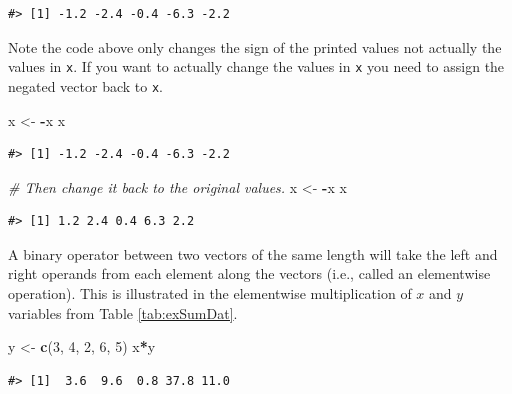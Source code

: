 \documentclass[
  11pt,
]{krantz}
\newenvironment{Shaded}{\begin{snugshade}}{\end{snugshade}}
\newcommand{\CommentTok}[1]{\textcolor[rgb]{0.56,0.35,0.01}{\textit{#1}}}
\newcommand{\DecValTok}[1]{\textcolor[rgb]{0.00,0.00,0.81}{#1}}
\newcommand{\KeywordTok}[1]{\textcolor[rgb]{0.13,0.29,0.53}{\textbf{#1}}}
\newcommand{\NormalTok}[1]{#1}
\newcommand{\OperatorTok}[1]{\textcolor[rgb]{0.81,0.36,0.00}{\textbf{#1}}}
\newcommand{\StringTok}[1]{\textcolor[rgb]{0.31,0.60,0.02}{#1}}
\theoremstyle{definition}
\theoremstyle{definition}
\theoremstyle{definition}
\theoremstyle{definition}
\theoremstyle{remark}
\begin{document}
\begin{verbatim}
#> [1] -1.2 -2.4 -0.4 -6.3 -2.2
\end{verbatim}

Note the code above only changes the sign of the printed values not actually the values in \texttt{x}. If you want to actually change the values in \texttt{x} you need to assign the negated vector back to \texttt{x}.

\begin{Shaded}
\begin{Highlighting}[]
\NormalTok{x \textless{}{-}}\StringTok{ }\OperatorTok{{-}}\NormalTok{x}
\NormalTok{x}
\end{Highlighting}
\end{Shaded}

\begin{verbatim}
#> [1] -1.2 -2.4 -0.4 -6.3 -2.2
\end{verbatim}

\begin{Shaded}
\begin{Highlighting}[]
\CommentTok{\# Then change it back to the original values.}
\NormalTok{x \textless{}{-}}\StringTok{ }\OperatorTok{{-}}\NormalTok{x}
\NormalTok{x}
\end{Highlighting}
\end{Shaded}

\begin{verbatim}
#> [1] 1.2 2.4 0.4 6.3 2.2
\end{verbatim}

A binary operator between two vectors of the same length will take the left and right operands from each element along the vectors (i.e., called an elementwise operation). This is illustrated in the elementwise multiplication of \(x\) and \(y\) variables from Table \ref{tab:exSumDat}.

\begin{Shaded}
\begin{Highlighting}[]
\NormalTok{y \textless{}{-}}\StringTok{ }\KeywordTok{c}\NormalTok{(}\DecValTok{3}\NormalTok{, }\DecValTok{4}\NormalTok{, }\DecValTok{2}\NormalTok{, }\DecValTok{6}\NormalTok{, }\DecValTok{5}\NormalTok{)}
\NormalTok{x}\OperatorTok{*}\NormalTok{y}
\end{Highlighting}
\end{Shaded}

\begin{verbatim}
#> [1]  3.6  9.6  0.8 37.8 11.0
\end{verbatim}
\end{document}
